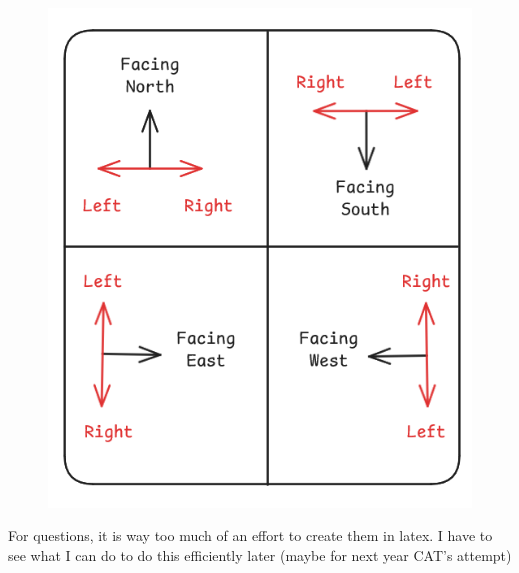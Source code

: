 \begin{figure}[h!]
    \centering
    \includegraphics[width=0.4\linewidth]{LRDI/Images/Arrangements_Directions.png}    
\end{figure}

\begin{NOTE}
    For questions, it is way too much of an effort to create them in latex. I have to see what I can do to do this efficiently later (maybe for next year CAT's attempt)
\end{NOTE}